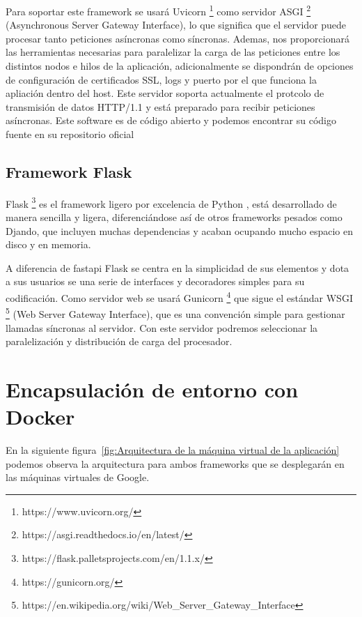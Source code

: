 Para soportar este framework se usará Uvicorn \footnote{https://www.uvicorn.org/} como servidor ASGI \footnote{https://asgi.readthedocs.io/en/latest/} (Asynchronous Server Gateway Interface), lo que significa que el servidor puede procesar tanto peticiones asíncronas como síncronas.
Ademas, nos proporcionará las herramientas necesarias para paralelizar la carga de las peticiones
entre los distintos nodos e hilos de la aplicación, adicionalmente se dispondrán de opciones de configuración de certificados SSL, logs y puerto por el que funciona la apliación dentro del host.
Este servidor soporta actualmente el protcolo de transmisión de datos HTTP/1.1 y está preparado para recibir peticiones asíncronas.
Este software es de código abierto y podemos encontrar su código fuente en su repositorio oficial

\subsection{Framework Flask}\label{subsec:framework-flask}
Flask \footnote{https://flask.palletsprojects.com/en/1.1.x/} es el framework ligero por excelencia de Python , está desarrollado de manera sencilla y ligera, diferenciándose así de otros frameworks pesados como Djando, que incluyen
muchas dependencias y acaban ocupando mucho espacio en disco y en memoria.

A diferencia de fastapi Flask se centra en la simplicidad de sus elementos y dota a sus usuarios se una serie de interfaces y decoradores simples para su codificación.
Como servidor web se usará Gunicorn \footnote{https://gunicorn.org/} que sigue el estándar WSGI \footnote{https://en.wikipedia.org/wiki/Web\_Server\_Gateway\_Interface} (Web Server Gateway Interface), que es una convención simple para gestionar llamadas síncronas al servidor.
Con este servidor podremos seleccionar la paralelización y distribución de carga del procesador.


\section{Encapsulación de entorno con Docker}\label{sec:encapsulación-de-entorno-con-docker}
En la siguiente figura~\ref{fig:Arquitectura de la máquina virtual de la aplicación} podemos observa la arquitectura para ambos frameworks que se desplegarán en las máquinas virtuales de Google.

